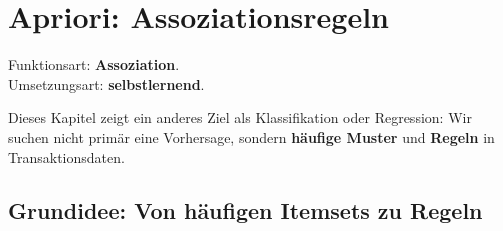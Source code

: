 \chapter{Apriori: Assoziationsregeln}
\label{chap:apriori}

\begin{myremark}
    Funktionsart: \textbf{Assoziation}. \\
    Umsetzungsart: \textbf{selbstlernend}.
\end{myremark}

\begin{myremark}
    Dieses Kapitel zeigt ein anderes Ziel als Klassifikation oder Regression:
    Wir suchen nicht primär eine Vorhersage, sondern \textbf{häufige Muster} und \textbf{Regeln}
    in Transaktionsdaten.
\end{myremark}

\section{Grundidee: Von häufigen Itemsets zu Regeln}

